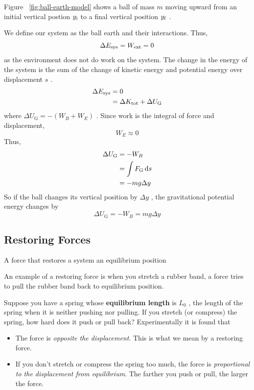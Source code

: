 Figure~%
\ref{fig:ball-earth-model} shows a ball of mass
$
    m
$ moving upward from an initial vertical postion
$
    y_{\mathrm{i}}
$ to a final vertical position
$
    y_{\mathrm{f}}
$%
.

We define our system as the ball earth and their interactions.  Thus,
\begin{equation}
    \Delta E_{\mathrm{sys}} = W_{\mathrm{ext}} = 0
\end{equation}
as the environment does not do work on the system.  The change in the
energy of the system is the sum of the change of kinetic energy and
potential energy over displacement
$
    s
$%
.
\begin{align}
    \Delta E_{\mathrm{sys}} &= 0 \\
    &= \Delta K_{\mathrm{tot}} + \Delta U_\mathrm{G}
\end{align}
where
$
    \Delta U_\mathrm{G} = -(W_B + W_E)
$%
.  Since work is the integral of force and displacement,
\begin{equation}
    W_E \approx 0
\end{equation}
Thus,
\begin{align}
    \Delta U_\mathrm{G} &= -W_B \\
    &= \int F_\mathrm{G} \dif s \\
    &= -mg\Delta y
\end{align}
So if the ball changes its vertical position by
$
    \Delta y
$%
, the gravitational potential energy changes by
\begin{equation}
    \Delta U_\mathrm{G} = -W_B = mg\Delta y
\end{equation}

\subsection{Restoring Forces}

\begin{definition}
    A force that restores a system an equilibrium position
\end{definition}

An example of a restoring force is when you stretch a rubber band, a
force tries to pull the rubber band back to equilibrium position.

Suppose you have a spring whose \textbf{equilibrium length} is
$
    L_0
$%
, the length of the spring when it is neither pushing nor pulling.  If
you stretch (or compress) the spring, how hard does it push or pull
back?  Experimentally it is found that
\begin{itemize}
    \item
        The force is \emph{opposite the displacement}.  This is what we
        mean by a restoring force.
    \item
        If you don't stretch or compress the spring too much, the force
        is \emph{proportional to the displacement from equilibrium}. The
        farther you push or pull, the larger the force.
\end{itemize}

